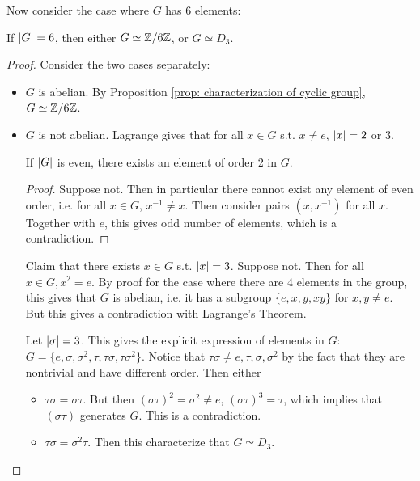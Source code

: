 Now consider the case where $G$ has 6 elements:

\begin{proposition}
    If $\left|G\right| = 6$, then either $G \simeq \mathbb{Z}/6\mathbb{Z}$, or $G \simeq D_3$. 
\end{proposition}

\begin{proof}
    Consider the two cases separately:
    \begin{itemize}
        \item $G$ is abelian. By Proposition \ref{prop: characterization of cyclic group}, $G \simeq \mathbb{Z}/6\mathbb{Z}$.
        \item $G$ is not abelian. Lagrange gives that for all $x \in G$ s.t. $x \neq e$, $\left|x\right| = 2$ or $3$.
        \begin{lemma}
            If $\left|G\right|$ is even, there exists an element of order 2 in $G$.
        \end{lemma}
        \begin{proof}
            Suppose not. Then in particular there cannot exist any element of even order, i.e. for all $x \in G$, $x^{-1} \neq x$. Then consider pairs $(x, x^{-1})$ for all $x$. Together with $e$, this gives odd number of elements, which is a contradiction.
        \end{proof}
        Claim that there exists $x \in G$ s.t. $\left|x\right| = 3$. Suppose not. Then for all $x \in G, x^2 = e$. By proof for the case where there are 4 elements in the group, this gives that $G$ is abelian, i.e. it has a subgroup $\{ e, x, y, xy \}$ for $x, y \neq e$. But this gives a contradiction with Lagrange's Theorem.

        Let $\left|\sigma\right| = 3$. This gives the explicit expression of elements in $G$: $G = \{e, \sigma, \sigma^2, \tau, \tau\sigma, \tau\sigma^2\}$. Notice that $\tau\sigma \neq e, \tau, \sigma, \sigma^2$ by the fact that they are nontrivial and have different order. Then either
        \begin{itemize}
            \item $\tau\sigma = \sigma\tau$. But then $(\sigma\tau)^2 = \sigma^2 \neq e$, $(\sigma\tau)^3 = \tau$, which implies that $(\sigma\tau)$ generates $G$. This is a contradiction.
            \item $\tau\sigma = \sigma^2\tau$. Then this characterize that $G \simeq D_3$.
        \end{itemize}
    \end{itemize}
\end{proof}

